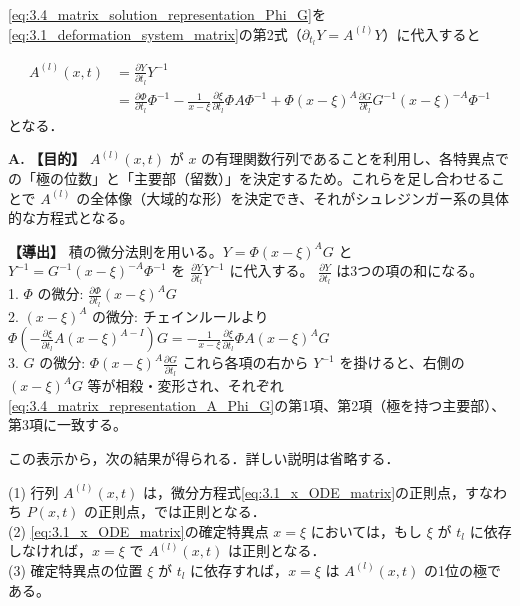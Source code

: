 \eqref{eq:3.4_matrix_solution_representation_Phi_G}を\eqref{eq:3.1_deformation_system_matrix}の第2式（$\partial_{t_l} Y = A^{(l)}Y$）に代入すると

\begin{align}\label{eq:3.4_matrix_representation_A_Phi_G}
  A^{(l)}(x,t) &= \frac{\partial Y}{\partial t_l}Y^{-1}\\
  &= \frac{\partial \Phi}{\partial t_l}\Phi^{-1} - \frac{1}{x-\xi}\frac{\partial \xi}{\partial t_l}\Phi A \Phi^{-1} + \Phi(x-\xi)^A \frac{\partial G}{\partial t_l}G^{-1}(x-\xi)^{-A}\Phi^{-1}\nonumber
\end{align}
となる．

\begin{Q}[なぜ特異点 $x=\xi$ の周りで局所表示\eqref{eq:3.4_matrix_solution_representation_Phi_G}を考え、複雑な\eqref{eq:3.4_matrix_representation_A_Phi_G}の計算を行う必要があるのか？ また、\eqref{eq:3.4_matrix_representation_A_Phi_G}は具体的にどのように導出されるか？]
\textbf{A.} \textbf{【目的】} $A^{(l)}(x,t)$ が $x$ の有理関数行列であることを利用し、各特異点での「極の位数」と「主要部（留数）」を決定するため。これらを足し合わせることで $A^{(l)}$ の全体像（大域的な形）を決定でき、それがシュレジンガー系の具体的な方程式となる。

\textbf{【導出】} 積の微分法則を用いる。$Y = \Phi (x-\xi)^A G$ と $Y^{-1} = G^{-1} (x-\xi)^{-A} \Phi^{-1}$ を $\frac{\partial Y}{\partial t_l}Y^{-1}$ に代入する。
$\frac{\partial Y}{\partial t_l}$ は3つの項の和になる。\\
1. $\Phi$ の微分: $\frac{\partial \Phi}{\partial t_l} (x-\xi)^A G$\\
2. $(x-\xi)^A$ の微分: チェインルールより $\Phi \left( - \frac{\partial \xi}{\partial t_l} A (x-\xi)^{A-I} \right) G = - \frac{1}{x-\xi} \frac{\partial \xi}{\partial t_l} \Phi A (x-\xi)^A G$\\
3. $G$ の微分: $\Phi (x-\xi)^A \frac{\partial G}{\partial t_l}$
これら各項の右から $Y^{-1}$ を掛けると、右側の $(x-\xi)^A G$ 等が相殺・変形され、それぞれ\eqref{eq:3.4_matrix_representation_A_Phi_G}の第1項、第2項（極を持つ主要部）、第3項に一致する。
\end{Q}

この表示から，次の結果が得られる．詳しい説明は省略する．

\begin{proposition}\label{prop:3.4_matrix_ODE_monodoromy_deformation_property}
(1) 行列 $A^{(l)}(x,t)$ は，微分方程式\eqref{eq:3.1_x_ODE_matrix}の正則点，すなわち $P(x,t)$ の正則点，では正則となる．\\
(2) \eqref{eq:3.1_x_ODE_matrix}の確定特異点 $x=\xi$ においては，もし $\xi$ が $t_l$ に依存しなければ，$x=\xi$ で $A^{(l)}(x,t)$ は正則となる．\\
(3) 確定特異点の位置 $\xi$ が $t_l$ に依存すれば，$x=\xi$ は $A^{(l)}(x,t)$ の1位の極である。
\end{proposition}

